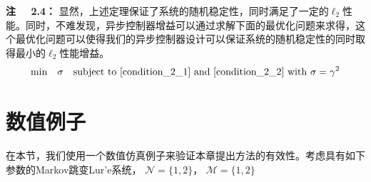 	{\bf 注 \ \ 2.4：} 
	显然，上述定理保证了系统的随机稳定性，同时满足了一定的$\ell_2$性能。同时，不难发现，异步控制器增益可以通过求解下面的最优化问题来求得，这个最优化问题可以使得我们的异步控制器设计可以保证系统的随机稳定性的同时取得最小的$\ell_2$性能增益。
	\begin{equation} \notag
	\mathrm{min}\quad \sigma \quad \mathrm{subject \ to} \ \eqref{condition_2_1} \ \mathrm{and} \ \eqref{condition_2_2} \ \mathrm{with} \ \sigma=\gamma^{2} 
	\end{equation}
	
\section{数值例子}
	在本节，我们使用一个数值仿真例子来验证本章提出方法的有效性。考虑具有如下参数的Markov跳变Lur’e系统， $\mathcal{N}=\{1,2\}$， $\mathcal{M}=\{1,2\}$ 
